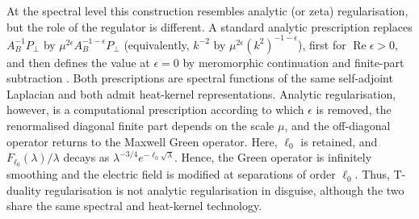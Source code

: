 \documentclass[nopacs,amsmath,amsfonts,amssymb,aps,superscriptaddress]{revtex4}
\newcommand{\revadd}[1]{#1}
\begin{document}
\revadd{At the spectral level this construction resembles analytic (or zeta) regularisation, but the role of the regulator is different. A standard analytic prescription replaces $A_B^{-1}P_\perp$ by $\mu^{2\epsilon}A_B^{-1-\epsilon}P_\perp$ (equivalently, $k^{-2}$ by $\mu^{2\epsilon}(k^2)^{-1-\epsilon}$), first for $\operatorname{Re}\epsilon>0$, and then defines the value at $\epsilon=0$ by meromorphic continuation and finite-part subtraction \cite{Seeley1967}. Both prescriptions are spectral functions of the same self-adjoint Laplacian and both admit heat-kernel representations. Analytic regularisation, however, is a computational prescription according to which $\epsilon$ is removed, the renormalised diagonal finite part depends on the scale $\mu$, and the off-diagonal operator returns to the Maxwell Green operator. Here, $\ell_0$ is retained, and $F_{\ell_0}(\lambda)/\lambda$ decays as $\lambda^{-3/4}e^{-\ell_0\sqrt{\lambda}}$. Hence, the Green operator is infinitely smoothing and the electric field is modified at separations of order $\ell_0$. Thus, T-duality regularisation is not analytic regularisation in disguise, although the two share the same spectral and heat-kernel technology.}
\end{document}
